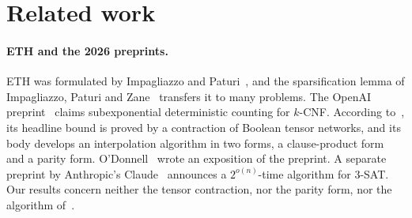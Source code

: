\documentclass[11pt,a4paper]{article}
\theoremstyle{definition}
\theoremstyle{remark}
\begin{document}
\section{Related work}\label{sec:related}

\paragraph{ETH and the 2026 preprints.} ETH was formulated by Impagliazzo and
Paturi~\cite{IP01}, and the sparsification lemma of Impagliazzo, Paturi and Zane~\cite{IPZ01}
transfers it to many problems. The OpenAI preprint~\cite{OpenAI} claims subexponential
deterministic counting for $k$-CNF. According to~\cite{DL}, its headline bound is proved by a
contraction of Boolean tensor networks, and its body develops an interpolation algorithm in
two forms, a clause-product form and a parity form. O'Donnell~\cite{ODonnell} wrote an
exposition of the preprint. A separate preprint by Anthropic's Claude~\cite{Claude} announces a
$2^{o(n)}$-time algorithm for 3-SAT. Our results concern neither the tensor contraction, nor
the parity form, nor the algorithm of~\cite{Claude}.
\end{document}
